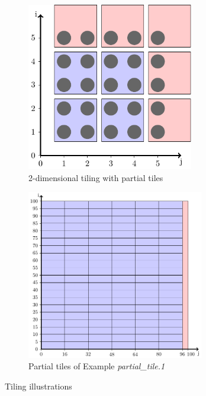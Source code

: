 \begin{figure}[H]
\begin{subfigure}[b]{.5\textwidth}
\includegraphics[width=0.8\textwidth]{figs/tile-2d_tiling}
\centering
\caption{2-dimensional tiling with partial tiles}\label{fig:2d_tiling}
\end{subfigure}%
\begin{subfigure}[b]{.5\textwidth}
\includegraphics[width=0.85\textwidth]{figs/tile-Example_tile2}
\vspace*{2mm}
\centering
\caption{Partial tiles of Example \emph{partial\_tile.1}}\label{fig:Example_tile2}
\end{subfigure}
\caption{Tiling illustrations}
\end{figure}

